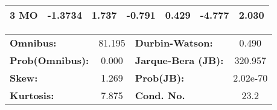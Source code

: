 \begin{center}
\begin{tabular}{lcccccc}
\textbf{3 MO}      &      -1.3734  &        1.737     &    -0.791  &         0.429        &       -4.777    &        2.030     \\
\bottomrule
\end{tabular}
\begin{tabular}{lclc}
\textbf{Omnibus:}       & 81.195 & \textbf{  Durbin-Watson:     } &    0.490  \\
\textbf{Prob(Omnibus):} &  0.000 & \textbf{  Jarque-Bera (JB):  } &  320.957  \\
\textbf{Skew:}          &  1.269 & \textbf{  Prob(JB):          } & 2.02e-70  \\
\textbf{Kurtosis:}      &  7.875 & \textbf{  Cond. No.          } &     23.2  \\
\bottomrule
\end{tabular}
\end{center}


